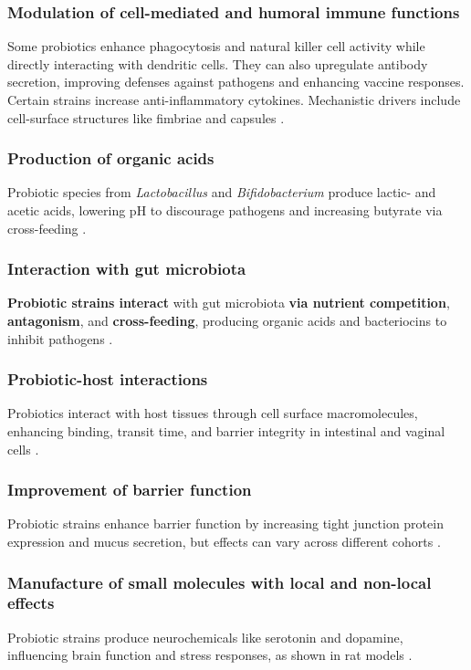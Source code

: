 \subsubsection*{Modulation of cell-mediated and humoral immune functions}
Some probiotics enhance phagocytosis and natural killer cell activity while directly interacting with dendritic cells. They can also upregulate antibody secretion, improving defenses against pathogens and enhancing vaccine responses. Certain strains increase anti-inflammatory cytokines. Mechanistic drivers include cell-surface structures like fimbriae and capsules \cite*{L10-Pro_Pre}.

\subsubsection*{Production of organic acids}
Probiotic species from \textit{Lactobacillus} and \textit{Bifidobacterium} produce lactic- and acetic acids, lowering pH to discourage pathogens and increasing butyrate via cross-feeding \cite*{L10-Pro_Pre}.

\subsubsection*{Interaction with gut microbiota}
\textbf{Probiotic strains interact} with gut microbiota \textbf{via nutrient competition}, \textbf{antagonism}, and \textbf{cross-feeding}, producing organic acids and bacteriocins to inhibit pathogens \cite*{L10-Pro_Pre}.

\subsubsection*{Probiotic-host interactions}
Probiotics interact with host tissues through cell surface macromolecules, enhancing binding, transit time, and barrier integrity in intestinal and vaginal cells \cite*{L10-Pro_Pre}.

\subsubsection*{Improvement of barrier function}
Probiotic strains enhance barrier function by increasing tight junction protein expression and mucus secretion, but effects can vary across different cohorts \cite*{L10-Pro_Pre}.

\subsubsection*{Manufacture of small molecules with local and non-local effects}
Probiotic strains produce neurochemicals like serotonin and dopamine, influencing brain function and stress responses, as shown in rat models \cite*{L10-Pro_Pre}.

